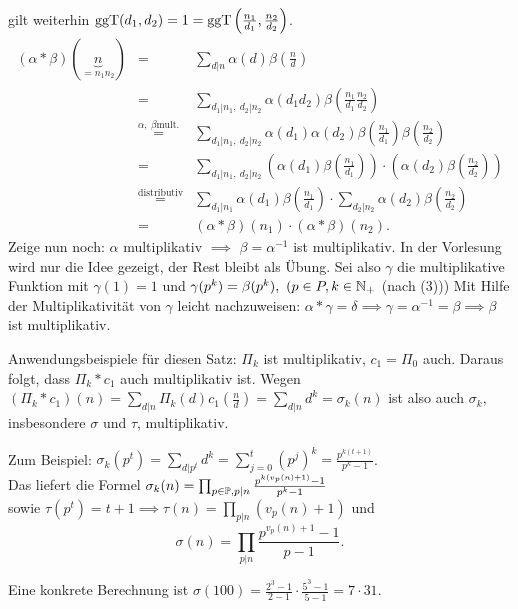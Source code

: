 \documentclass[a4paper,DIV15,BCOR12mm]{article}
\begin{document}
\begin{beweis}
\begin{enumerate}
        gilt weiterhin $\mathop{\rm ggT}\nolimits(d_1,d_2)=1=\mathop{\rm ggT}\nolimits\left(\frac {n_1}{d_1},\frac{n_2}{d_2}
        \right)$.
        \begin{eqnarray*}
            (\alpha * \beta)(\underbrace{n}_{=n_1 n_2}) &=&
            \sum_{d|n} \alpha(d) \beta(\frac n d)\\
            &=&\sum_{d_1|n_1,\ d_2|n_2} \alpha(d_1 d_2) \beta\left(\frac
            {n_1}{d_1} \frac{n_2}{d_2}\right)\\
            &\stackrel{\alpha,\ \beta \text{
            mult.}}{=}&\sum_{d_1|n_1,\ d_2|n_2} \alpha(d_1) \alpha(d_2)
            \beta\left(\frac{n_1}{d_1}\right)
            \beta\left(\frac{n_2}{d_2}\right)\\
            &=&\sum_{d_1|n_1,\ d_2|n_2} \left(\alpha(d_1)
            \beta\left(\frac{n_1}{d_1}\right)\right) \cdot
            \left(\alpha(d_2)\beta\left(\frac{n_2}{d_2}\right)\right)\\
            &\stackrel{\text{distributiv}}{=}&\sum_{d_1|n_1} \alpha(d_1)
            \beta\left(\frac{n_1}{d_1}\right) \cdot \sum_{d_2|n_2}
            \alpha(d_2)\beta\left(\frac{n_2}{d_2}\right)\\
            &=& (\alpha * \beta)(n_1) \cdot (\alpha * \beta)(n_2).
        \end{eqnarray*}
        Zeige nun noch: $\alpha$ multiplikativ $\implies$
        $\beta=\alpha^{-1}$ ist multiplikativ. In der Vorlesung wird
        nur die Idee gezeigt, der Rest bleibt als Übung. Sei also
        $\gamma$ die multiplikative Funktion mit $\gamma(1)=1$ und
        $\gamma(p^k)=\beta(p^k),\ (p\in P, k \in \mathbb{N}_+$ (nach (3)))
        Mit Hilfe der Multiplikativität von $\gamma$ leicht
        nachzuweisen: $\alpha * \gamma = \delta \implies
        \gamma=\alpha^{-1}=\beta \implies \beta$ ist multiplikativ.
    \end{enumerate}
\end{beweis}

\begin{beispiel}
Anwendungsbeispiele für diesen Satz: $\Pi_k$ ist multiplikativ, $c_1
= \Pi_0$ auch. Daraus folgt, dass $\Pi_k * c_1$ auch multiplikativ
ist. Wegen $(\Pi_k * c_1)(n) = \sum_{d|n} \Pi_k(d) c_1(\frac n d) =
\sum_{d|n} d^k = \sigma_k(n)$ ist also auch $\sigma_k$, insbesondere
$\sigma$ und $\tau$, multiplikativ.

Zum Beispiel: $\sigma_k(p^t) = \sum_{d|p^t} d^k = \sum_{j=0}^t
(p^j)^k = \frac{p^{k(t+1)}}{p^k-1}$. \\
Das liefert die Formel
$\sigma_k(n) = \prod_{p\in\mathbb{P}, p|n} \frac{p^{k(v_p(n)+1)} - 1}{p^k-1}$ \\
sowie $\tau(p^t) = t+1 \implies \tau(n) = \prod_{p|n}(v_p(n) + 1)$ und
\begin{equation}\label{eq:Teilersumme}
    \sigma(n) = \prod_{p|n} \frac {p^{v_p(n) +1} -1 }{p-1}.
\end{equation}

Eine konkrete Berechnung ist $\sigma(100) = \frac{2^3 - 1}{2-1}
\cdot \frac{5^3 -1}{5-1} = 7\cdot 31$.
\end{beispiel}
\end{document}

